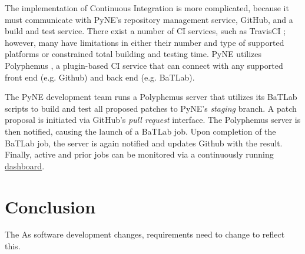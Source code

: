 \documentclass{anstrans}
\begin{document}
The implementation of Continuous Integration is more complicated, because it
must communicate with PyNE's repository management service, GitHub, and a build
and test service. There exist a number of CI services, such as TravisCI
\cite{travis_2014}; however, many have limitations in either their number and
type of supported platforms or constrained total building and testing time. PyNE
utilizes Polyphemus \cite{polyphemus_2014}, a plugin-based CI service that can
connect with any supported front end (e.g. Github) and back end (e.g. BaTLab).

The PyNE development team runs a Polyphemus server that utilizes its BaTLab
scripts to build and test all proposed patches to PyNE's \textit{staging}
branch. A patch proposal is initiated via GitHub's \textit{pull request}
interface. The Polyphemus server is then notified, causing the launch of a
BaTLab job. Upon completion of the BaTLab job, the server is again notified and
updates Github with the result. Finally, active and prior jobs can be monitored
via a continuously running \href{http://gorgus.pyne.io/dashboard}{dashboard}.

\section{Conclusion}

The 
As software development changes, requirements need to change to reflect this.



\end{document}
